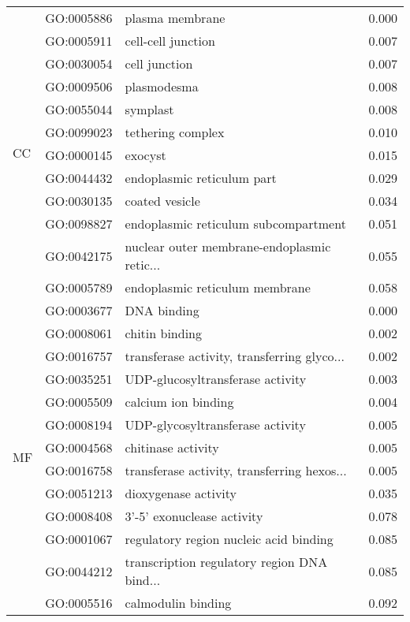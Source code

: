 \begin{longtable}{lllr}
\cline{1-4}
\multirow{12}{*}{CC} & GO:0005886 &                              plasma membrane &         0.000 \\
   & GO:0005911 &                           cell-cell junction &         0.007 \\
   & GO:0030054 &                                cell junction &         0.007 \\
   & GO:0009506 &                                  plasmodesma &         0.008 \\
   & GO:0055044 &                                     symplast &         0.008 \\
   & GO:0099023 &                            tethering complex &         0.010 \\
   & GO:0000145 &                                      exocyst &         0.015 \\
   & GO:0044432 &                   endoplasmic reticulum part &         0.029 \\
   & GO:0030135 &                               coated vesicle &         0.034 \\
   & GO:0098827 &         endoplasmic reticulum subcompartment &         0.051 \\
   & GO:0042175 &  nuclear outer membrane-endoplasmic retic... &         0.055 \\
   & GO:0005789 &               endoplasmic reticulum membrane &         0.058 \\
\cline{1-4}
\multirow{13}{*}{MF} & GO:0003677 &                                  DNA binding &         0.000 \\
   & GO:0008061 &                               chitin binding &         0.002 \\
   & GO:0016757 &  transferase activity, transferring glyco... &         0.002 \\
   & GO:0035251 &             UDP-glucosyltransferase activity &         0.003 \\
   & GO:0005509 &                          calcium ion binding &         0.004 \\
   & GO:0008194 &             UDP-glycosyltransferase activity &         0.005 \\
   & GO:0004568 &                           chitinase activity &         0.005 \\
   & GO:0016758 &  transferase activity, transferring hexos... &         0.005 \\
   & GO:0051213 &                         dioxygenase activity &         0.035 \\
   & GO:0008408 &                   3'-5' exonuclease activity &         0.078 \\
   & GO:0001067 &       regulatory region nucleic acid binding &         0.085 \\
   & GO:0044212 &  transcription regulatory region DNA bind... &         0.085 \\
   & GO:0005516 &                           calmodulin binding &         0.092 \\
\end{longtable}
